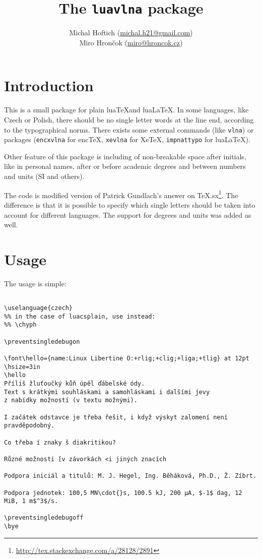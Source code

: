 \documentclass[12pt]{ltxdoc}
\begin{document}
\title{The \verb|luavlna| package}
\author{Michal Hoftich (\url{michal.h21@gmail.com})\\Miro Hrončok (\url{miro@hroncok.cz})}
\maketitle
\tableofcontents
\section{Introduction}


This is a small package for plain lua\TeX and lua\LaTeX. In some languages, like
Czech or Polish, there should be no single letter words at the line
end, according to the typographical norms. There exists some
external commands (like \verb!vlna!) or packages (\verb!encxvlna!
for enc\TeX, \verb!xevlna! for Xe\TeX,
\verb!impnattypo! for lua\LaTeX). %

Other feature of this package is including of non-breakable space after 
initials, like in personal names, after or before academic degrees
and between numbers and units (SI and others).

The code is modified version of Patrick Gundlach's answer on
TeX.sx\footnote{\url{http://tex.stackexchange.com/a/28128/2891}}.
The difference is that it is possible to specify which single letters
should be taken into account for different languages.
The support for degrees and units was added as well.


\section{Usage}

The usage is simple:

\begin{verbatim}

\uselanguage{czech}
%% in the case of luacsplain, use instead:
%% \chyph

\preventsingledebugon

\font\hello={name:Linux Libertine O:+rlig;+clig;+liga;+tlig} at 12pt 
\hsize=3in
\hello
Příliš žluťoučký kůň úpěl ďábelské ódy. 
Text s krátkými souhláskami a samohláskami i dalšími jevy 
z nabídky možností (v textu možnými). 

I začátek odstavce je třeba řešit, i když výskyt zalomení není pravděpodobný.

Co třeba í znaky š diakritikou?

Různé možnosti [v závorkách <i jiných znacích

Podpora iniciál a titulů: M. J. Hegel, Ing. Běháková, Ph.D., Ž. Zíbrt.

Podpora jednotek: 100,5 MN\cdot{}s, 100.5 kJ, 200 µA, $-1$ dag, 12 MiB, 1 m$^3$/s.

\preventsingledebugoff
\bye
\end{verbatim}
\end{document}
